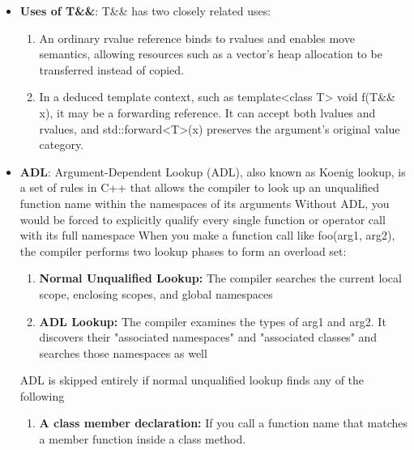 \documentclass{report}
\begin{document}
\begin{itemize}
\begin{enumerate}
\begin{cppcode}
                        function(Worker{});  // value.work() becomes valid
                        function(42);        // Error: int has no work()
                    \end{cppcode}
                    \bigbreak \noindent 
                    This delayed checking is one reason template errors often appear at the point where the template is instantiated.
            \end{enumerate}
        \item \textbf{Uses of T\&\&}: T\&\& has two closely related uses:
            \begin{enumerate}
                \item An ordinary rvalue reference binds to rvalues and enables move semantics, allowing resources such as a vector’s heap allocation to be transferred instead of copied.
                \item In a deduced template context, such as template<class T> void f(T\&\& x), it may be a forwarding reference. It can accept both lvalues and rvalues, and std::forward<T>(x) preserves the argument’s original value category.
            \end{enumerate}
        \item \textbf{ADL}: Argument-Dependent Lookup (ADL), also known as Koenig lookup, is a set of rules in C++ that allows the compiler to look up an unqualified function name within the namespaces of its arguments
            \bigbreak \noindent 
            Without ADL, you would be forced to explicitly qualify every single function or operator call with its full namespace
            \bigbreak \noindent 
            When you make a function call like foo(arg1, arg2), the compiler performs two lookup phases to form an overload set:
            \begin{enumerate}
                \item \textbf{Normal Unqualified Lookup:} The compiler searches the current local scope, enclosing scopes, and global namespaces
                \item \textbf{ADL Lookup:} The compiler examines the types of arg1 and arg2. It discovers their "associated namespaces" and "associated classes" and searches those namespaces as well
            \end{enumerate}
            ADL is skipped entirely if normal unqualified lookup finds any of the following
            \begin{enumerate}
                \item \textbf{A class member declaration:} If you call a function name that matches a member function inside a class method.

\end{enumerate}
\end{itemize}
\end{document}

